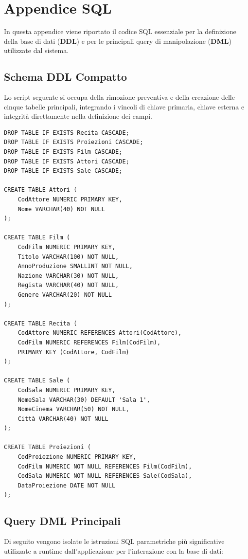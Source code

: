 \documentclass{article}
\begin{document}
\section{Appendice SQL}

In questa appendice viene riportato il codice SQL essenziale per la definizione della base di dati (\textbf{DDL}) e per le principali query di manipolazione (\textbf{DML}) utilizzate dal sistema.

\subsection{Schema DDL Compatto}
Lo script seguente si occupa della rimozione preventiva e della creazione delle cinque tabelle principali, integrando i vincoli di chiave primaria, chiave esterna e integrità direttamente nella definizione dei campi.

\begin{verbatim}
DROP TABLE IF EXISTS Recita CASCADE;
DROP TABLE IF EXISTS Proiezioni CASCADE;
DROP TABLE IF EXISTS Film CASCADE;
DROP TABLE IF EXISTS Attori CASCADE;
DROP TABLE IF EXISTS Sale CASCADE;

CREATE TABLE Attori (
    CodAttore NUMERIC PRIMARY KEY,
    Nome VARCHAR(40) NOT NULL
);

CREATE TABLE Film (
    CodFilm NUMERIC PRIMARY KEY, 
    Titolo VARCHAR(100) NOT NULL,
    AnnoProduzione SMALLINT NOT NULL,
    Nazione VARCHAR(30) NOT NULL,
    Regista VARCHAR(40) NOT NULL,
    Genere VARCHAR(20) NOT NULL
);

CREATE TABLE Recita (
    CodAttore NUMERIC REFERENCES Attori(CodAttore),
    CodFilm NUMERIC REFERENCES Film(CodFilm),
    PRIMARY KEY (CodAttore, CodFilm)
);

CREATE TABLE Sale (
    CodSala NUMERIC PRIMARY KEY, 
    NomeSala VARCHAR(30) DEFAULT 'Sala 1',
    NomeCinema VARCHAR(50) NOT NULL,
    Città VARCHAR(40) NOT NULL
);

CREATE TABLE Proiezioni (
    CodProiezione NUMERIC PRIMARY KEY,
    CodFilm NUMERIC NOT NULL REFERENCES Film(CodFilm),
    CodSala NUMERIC NOT NULL REFERENCES Sale(CodSala),
    DataProiezione DATE NOT NULL
);
\end{verbatim}

\subsection{Query DML Principali}
Di seguito vengono isolate le istruzioni SQL parametriche più significative utilizzate a runtime dall'applicazione per l'interazione con la base di dati:
\end{document}
